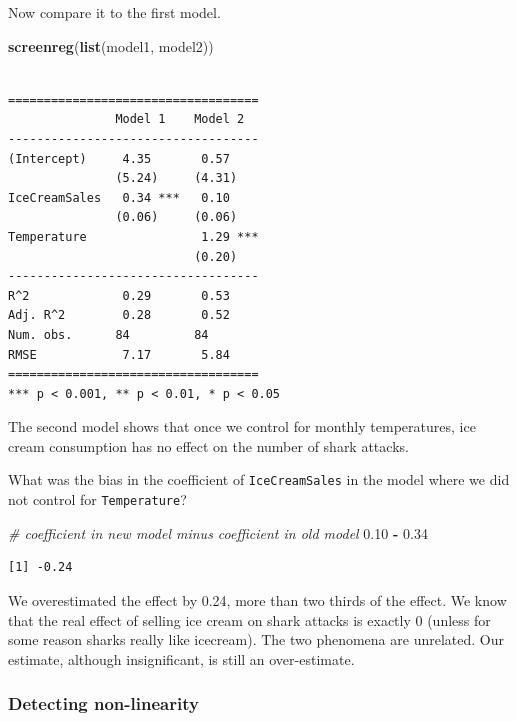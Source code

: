 \documentclass[]{article}
\newenvironment{Shaded}{\begin{snugshade}}{\end{snugshade}}
\newcommand{\KeywordTok}[1]{\textcolor[rgb]{0.13,0.29,0.53}{\textbf{#1}}}
\newcommand{\FloatTok}[1]{\textcolor[rgb]{0.00,0.00,0.81}{#1}}
\newcommand{\StringTok}[1]{\textcolor[rgb]{0.31,0.60,0.02}{#1}}
\newcommand{\CommentTok}[1]{\textcolor[rgb]{0.56,0.35,0.01}{\textit{#1}}}
\newcommand{\OperatorTok}[1]{\textcolor[rgb]{0.81,0.36,0.00}{\textbf{#1}}}
\newcommand{\NormalTok}[1]{#1}
\theoremstyle{definition}
\theoremstyle{definition}
\theoremstyle{definition}
\theoremstyle{remark}
\begin{document}
Now compare it to the first model.

\begin{Shaded}
\begin{Highlighting}[]
\KeywordTok{screenreg}\NormalTok{(}\KeywordTok{list}\NormalTok{(model1, model2))}
\end{Highlighting}
\end{Shaded}

\begin{verbatim}

===================================
               Model 1    Model 2  
-----------------------------------
(Intercept)     4.35       0.57    
               (5.24)     (4.31)   
IceCreamSales   0.34 ***   0.10    
               (0.06)     (0.06)   
Temperature                1.29 ***
                          (0.20)   
-----------------------------------
R^2             0.29       0.53    
Adj. R^2        0.28       0.52    
Num. obs.      84         84       
RMSE            7.17       5.84    
===================================
*** p < 0.001, ** p < 0.01, * p < 0.05
\end{verbatim}

The second model shows that once we control for monthly temperatures,
ice cream consumption has no effect on the number of shark attacks.

What was the bias in the coefficient of \texttt{IceCreamSales} in the
model where we did not control for \texttt{Temperature}?

\begin{Shaded}
\begin{Highlighting}[]
\CommentTok{# coefficient in new model minus coefficient in old model}
\FloatTok{0.10} \OperatorTok{-}\StringTok{  }\FloatTok{0.34}
\end{Highlighting}
\end{Shaded}

\begin{verbatim}
[1] -0.24
\end{verbatim}

We overestimated the effect by 0.24, more than two thirds of the effect.
We know that the real effect of selling ice cream on shark attacks is
exactly 0 (unless for some reason sharks really like icecream). The two
phenomena are unrelated. Our estimate, although insignificant, is still
an over-estimate.

\subsubsection{Detecting non-linearity}\label{detecting-non-linearity}
\end{document}
